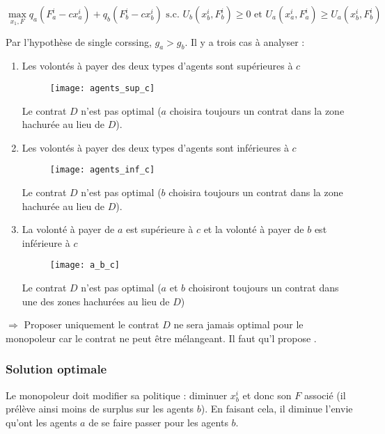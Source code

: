 \begin{equation*}
\max_{x_1, F} q_a(F_a^i - c x_a^i) + q_b (F_b^i - c x_b^i) \text{ s.c. } U_b(x^i_b, F^i_b) \geq 0 \text{ et } U_a(x^i_a, F^i_a) \geq U_a(x^i_b, F^i_b)
\end{equation*}

Par l'hypothèse de single corssing, $g_a > g_b$. Il y a trois cas à analyser :

\begin{enumerate}
\item Les volontés à payer des deux types d'agents sont supérieures à $c$
\begin{figure}[H]
	\centering
	\texttt{[image: agents\_sup\_c]}
\end{figure}
Le contrat $D$ n'est pas optimal ($a$ choisira toujours un contrat dans la zone hachurée au lieu de $D$).

\item Les volontés à payer des deux types d’agents sont inférieures à $c$
\begin{figure}[H]
	\centering
	\texttt{[image: agents\_inf\_c]}
\end{figure}
Le contrat $D$ n’est pas optimal ($b$ choisira toujours un contrat dans la zone hachurée au lieu de $D$).

\item La volonté à payer de $a$ est supérieure à $c$ et la volonté à payer de $b$ est inférieure à $c$
\begin{figure}[H]
	\centering
	\texttt{[image: a\_b\_c]}
\end{figure}
Le contrat $D$ n’est pas optimal ($a$ et $b$ choisiront toujours un contrat dans une des zones hachurées au lieu de $D$)
\end{enumerate}

$\Rightarrow$ Proposer uniquement le contrat $D$ ne sera jamais optimal pour le monopoleur car le contrat ne peut être mélangeant. Il faut qu'l propose .

\subsubsection{Solution optimale}

Le monopoleur doit modifier sa politique : diminuer $x^i_b$ et donc son $F$ associé (il prélève ainsi moins de surplus sur les agents $b$). En faisant cela, il diminue l'envie qu'ont les agents $a$ de se faire passer pour les agents $b$.

